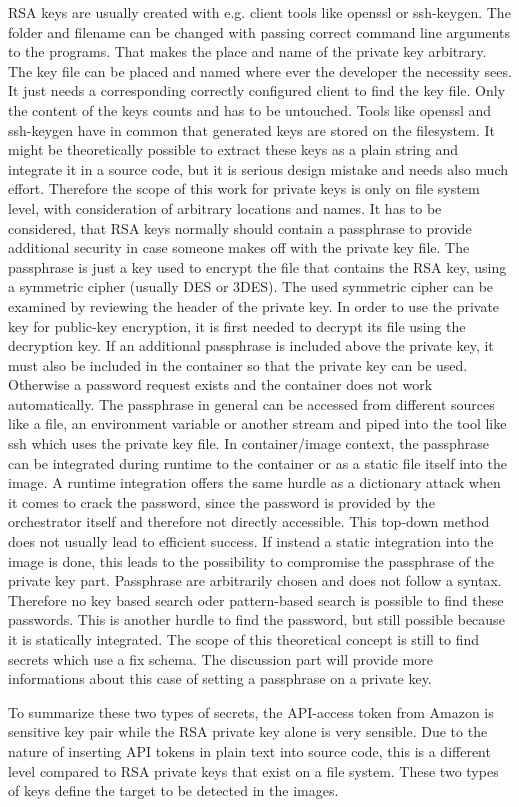 RSA keys are usually created with e.g. client tools like openssl or ssh-keygen. The folder and filename can be changed with passing correct command line arguments to the programs. That makes the place and name of the private key arbitrary. The key file can be placed and named where ever the developer the necessity sees. It just needs a corresponding correctly configured client to find the key file. Only the content of the keys counts and has to be untouched. 
Tools like openssl and ssh-keygen have in common that generated keys are stored on the filesystem. It might be theoretically possible to extract these keys as a plain string and integrate it in a source code, but it is serious design mistake and needs also much effort. Therefore the scope of this work for private keys is only on file system level, with consideration of arbitrary locations and names.
It has to be considered, that RSA keys normally should contain a passphrase to provide additional security in case someone makes off with the private key file. The passphrase is just a key used to encrypt the file that contains the RSA key, using a symmetric cipher (usually DES or 3DES). The used symmetric cipher can be examined by reviewing the header of the private key. In order to use the private key for public-key encryption, it is first needed to decrypt its file using the decryption key.
If an additional passphrase is included above the private key, it must also be included in the container so that the private key can be used. Otherwise a password request exists and the container does not work automatically. 
The passphrase in general can be accessed from different sources like a file, an environment variable or another stream and piped into the tool like ssh which uses the private key file.
In container/image context, the passphrase can be integrated during runtime to the container or as a static file itself into the image. A runtime integration offers the same hurdle as a dictionary attack when it comes to crack the password, since the password is provided by the orchestrator itself and therefore not directly accessible. This top-down method does not usually lead to efficient success. If instead a static integration into the image is done, this leads to the possibility to compromise the passphrase of the private key part. 
Passphrase are arbitrarily chosen and does not follow a syntax. Therefore no key based search oder pattern-based search is possible to find these passwords. This is another hurdle to find the password, but still possible because it is statically integrated. The scope of this theoretical concept is still to find secrets which use a fix schema. The discussion part will provide more informations about this case of setting a passphrase on a private key.

To summarize these two types of secrets, the API-access token from Amazon is sensitive key pair while the RSA private key alone is very sensible. 
Due to the nature of inserting API tokens in plain text into source code, this is a different level compared to RSA private keys that exist on a file system.
These two types of keys define the target to be detected in the images.

